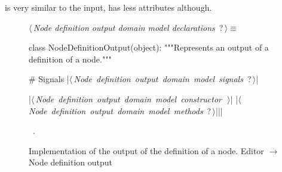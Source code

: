 \documentclass[%
    a4paper,    %
    justified,  %
    nobib,      %
    openany     %
]{tufte-book}
\begin{document}
 is very similar to
the input, has less attributes although.

\begin{figure}
\begin{flushleft} \small
\begin{minipage}{\linewidth}\label{scrap138}\raggedright\small
{} $\langle\,${\itshape Node definition output domain model declarations}\nobreak\ {\footnotesize {?}}$\,\rangle\equiv$
\vspace{-1ex}
\begin{pythoncode}
class NodeDefinitionOutput(object):
    """Represents an output of a definition of a node."""

    # Signals
    |\hbox{$\langle\,${\itshape Node definition output domain model signals}\nobreak\ {\footnotesize ?}$\,\rangle$}|

    |\hbox{$\langle\,${\itshape Node definition output domain model constructor}\nobreak\ {\footnotesize {}}$\,\rangle$}|
    |\hbox{$\langle\,${\itshape Node definition output domain model methods}\nobreak\ {\footnotesize ?}$\,\rangle$}||\NWsep|
\end{pythoncode}
\vspace{1.5ex}
\footnotesize
\begin{list}{}{\setlength{\itemsep}{-\parsep}\setlength{\itemindent}{-\leftmargin}}
\item \NWtxtMacroRefIn\ .

\item{}
\end{list}
\end{minipage}\vspace{4ex}
\end{flushleft}
\caption{Implementation of the output of the definition of a node.
  \newline{}\newline{}Editor $\rightarrow$ Node definition output}
\label{editor:lst:node-definition-output}
\end{figure}
\end{document}

